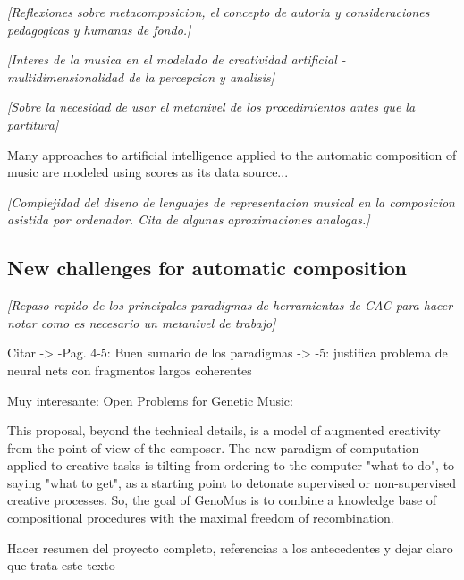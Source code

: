 \documentclass{article}
\begin{document}
{\color{gray} \textsl{[Reflexiones sobre metacomposicion, el concepto de autoria y consideraciones pedagogicas y humanas de fondo.]}}


{\color{gray} \textsl{[Interes de la musica en el modelado de creatividad artificial - multidimensionalidad de la percepcion y analisis]}}

{\color{gray} \textsl{[Sobre la necesidad de usar el metanivel de los procedimientos antes que la partitura]}}

Many approaches to artificial intelligence applied to the automatic composition of music are modeled using scores as its data source...

{\color{gray} \textsl{[Complejidad del diseno de lenguajes de representacion musical en la composicion asistida por ordenador. Cita de algunas aproximaciones analogas.]}}





\subsection{New challenges for automatic composition}




{\color{gray} \textsl{[Repaso rapido de los principales paradigmas de herramientas de CAC para hacer notar como es necesario un metanivel de trabajo]}}

{\color{red}
Citar \cite{Nierhaus:2008:ACP:1524239}
	-> -Pag. 4-5: Buen sumario de los paradigmas
	-> -5: justifica problema de neural nets con fragmentos largos coherentes 

Muy interesante: Open Problems for Genetic Music: \cite{DBLP:conf/evoW/McCormack05}
}

This proposal, beyond the technical details, is a model of augmented creativity from the point of view of the composer. The new paradigm of computation applied to creative tasks is tilting from ordering to the computer "what to do", to saying "what to get", as a starting point to detonate supervised or non-supervised creative processes. So, the goal of GenoMus is to combine a knowledge base of compositional procedures with the maximal freedom of recombination. 



Hacer resumen del proyecto completo, referencias a los antecedentes y dejar claro que trata este texto



\end{document}
